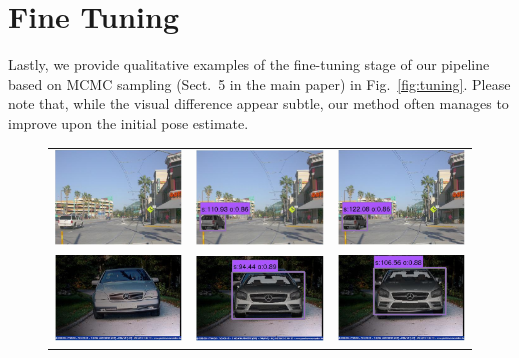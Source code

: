\documentclass[10pt,twocolumn,letterpaper]{article}
\begin{document}
\section{Fine Tuning}
Lastly, we provide qualitative examples of the fine-tuning stage of
our pipeline based on MCMC sampling (Sect.~5 in the main paper) in
Fig.~\ref{fig:tuning}. Please note that, while the visual difference
appear subtle, our method often manages to improve upon the initial
pose estimate.
%
\begin{figure}[h]
\setlength\tabcolsep{1pt}
\centering
\begin{tabular}{|ccc|}
	\hline
  \includegraphics[width=0.22\linewidth]{supp/tuning_1a.png} &
  \includegraphics[width=0.22\linewidth]{supp/tuning_1b.png} & 
  \includegraphics[width=0.22\linewidth]{supp/tuning_1c.png}  \\
  \includegraphics[width=0.22\linewidth]{supp/tuning_7a.png} &
  \includegraphics[width=0.22\linewidth]{supp/tuning_7b.png} & 
  \includegraphics[width=0.22\linewidth]{supp/tuning_7c.png}  \\ 

\end{tabular}
\end{figure}
\end{document}
